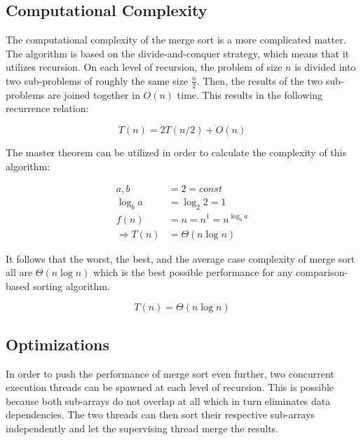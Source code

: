 \subsection{Computational Complexity}

The computational complexity of the merge sort is a more complicated matter. The algorithm is based on the divide-and-conquer strategy, which means that it utilizes recursion. On each level of recursion, the problem of size $n$ is divided into two sub-problems of roughly the same size $\frac{n}{2}$. Then, the results of the two sub-problems are joined together in $O(n)$ time. This results in the following recurrence relation:

\begin{equation*}
    T(n) = 2T(n/2) + O(n)
\end{equation*}

The master theorem can be utilized in order to calculate the complexity of this algorithm:

\begin{equation*}
    \begin{aligned}
        a, b &= 2 = const \\
        \log_b a &= \log_2 2 = 1 \\
        f(n) &= n = n^1 = n^{\log_b a} \\
        \Rightarrow T(n) &= \Theta(n \log n)
    \end{aligned}
\end{equation*}

It follows that the worst, the best, and the average case complexity of merge sort all are $\Theta(n \log n)$ which is the best possible performance for any comparison-based sorting algorithm.

\begin{equation*}
    T(n) = \Theta(n \log n)
\end{equation*}

\subsection{Optimizations}
\label{merge-sort:optimizations}

In order to push the performance of merge sort even further, two concurrent execution threads can be spawned at each level of recursion. This is possible because both sub-arrays do not overlap at all which in turn eliminates data dependencies. The two threads can then sort their respective sub-arrays independently and let the supervising thread merge the results.


